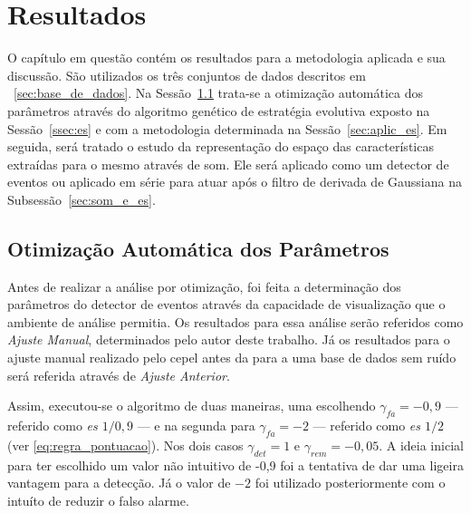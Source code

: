 \chapter{Resultados}
\label{chap:resultados}

O capítulo em questão contém os resultados para a metodologia aplicada
e sua discussão. São utilizados os três conjuntos de dados descritos em
~\ref{sec:base_de_dados}. Na Sessão~\ref{sec:otim_es} trata-se a otimização
automática dos parâmetros através do algoritmo genético de estratégia
evolutiva exposto na Sessão~\ref{ssec:es} e com a metodologia
determinada na Sessão~\ref{sec:aplic_es}. Em seguida, será tratado o
estudo da representação do espaço das características extraídas para o
mesmo através de \acs{som}. Ele será aplicado como um detector de
eventos ou aplicado em série para atuar após o filtro de derivada de
Gaussiana na Subsessão~\ref{sec:som_e_es}.

\section{Otimização Automática dos Parâmetros}
\label{sec:otim_es}

Antes de realizar a análise por otimização, foi feita a determinação
dos parâmetros do detector de eventos através da capacidade de
visualização que o ambiente de análise permitia. Os resultados para
essa análise serão referidos como \emph{Ajuste Manual}, determinados
pelo autor deste trabalho. Já os resultados para o ajuste manual
realizado pelo \acs{cepel} antes da para a uma base de dados sem ruído
será referida através de \emph{Ajuste Anterior}.

Assim, executou-se o algoritmo de duas maneiras, uma escolhendo
$\gamma_{fa}=-0,9$ --- referido como \emph{\acs{es} $1/0,9$} --- e 
na segunda para $\gamma_{fa}=-2$ --- referido como \emph{\acs{es}
$1/2$} (ver \ref{eq:regra_pontuacao}). Nos dois casos $\gamma_{det}=1$
e $\gamma_{rem}=-0,05$. A ideia inicial para ter escolhido um valor
não intuitivo de -0,9 foi a tentativa de dar uma ligeira vantagem para a
detecção. Já o valor de $-2$ foi utilizado posteriormente com o
intuíto de reduzir o falso alarme. 

